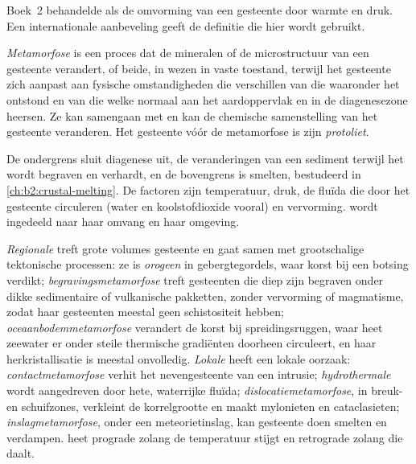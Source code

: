 Boek~2 behandelde  als de omvorming van een gesteente door warmte en
druk. Een internationale aanbeveling geeft de definitie die hier wordt gebruikt.

\begin{definition}\label{def:b2:metamorphic-facies:metamorphism}
\emph{Metamorfose} is een proces dat de mineralen of de
microstructuur van een gesteente verandert, of beide, in wezen in vaste toestand, terwijl het gesteente zich aanpast
aan fysische omstandigheden die verschillen van die waaronder het ontstond en van die
welke normaal aan het aardoppervlak en in de diagenesezone heersen. Ze kan samengaan met
 en kan de chemische samenstelling van het gesteente veranderen. Het gesteente vóór de
metamorfose is zijn \emph{protoliet}.
\end{definition}

De ondergrens sluit diagenese uit, de veranderingen van een sediment terwijl het wordt begraven en
verhardt, en de bovengrens is smelten, bestudeerd in \cref{ch:b2:crustal-melting}. De
factoren zijn temperatuur, druk, de fluïda die door het gesteente circuleren (water en
koolstofdioxide vooral) en vervorming.  wordt ingedeeld naar haar omvang en
haar omgeving.

\emph{Regionale}  treft grote volumes gesteente en gaat samen met grootschalige
tektonische processen: ze is \emph{orogeen} in gebergtegordels, waar korst bij een
botsing verdikt; \emph{begravingsmetamorfose} treft gesteenten die diep zijn begraven onder dikke
sedimentaire of vulkanische pakketten, zonder vervorming of magmatisme, zodat haar gesteenten
meestal geen schistositeit hebben; \emph{oceaanbodemmetamorfose} verandert de korst bij
spreidingsruggen, waar heet zeewater er onder steile thermische
gradiënten doorheen circuleert, en haar herkristallisatie is meestal onvolledig. \emph{Lokale} 
heeft een lokale oorzaak: \emph{contactmetamorfose} verhit het nevengesteente van een intrusie;
\emph{hydrothermale}  wordt aangedreven door hete, waterrijke fluïda;
\emph{dislocatiemetamorfose}, in breuk- en schuifzones, verkleint de korrelgrootte en
maakt mylonieten en cataclasieten; \emph{inslagmetamorfose}, onder een meteorietinslag,
kan gesteente doen smelten en verdampen.  heet prograde zolang de temperatuur stijgt en
retrograde zolang die daalt.

